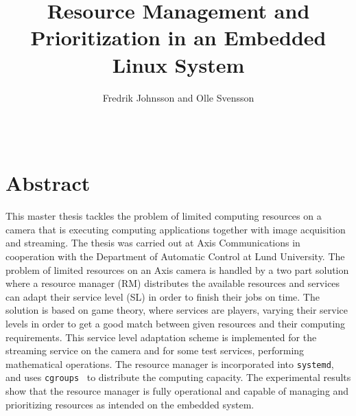 \documentclass[nobiblatex]{LTHthesis}
\begin{document}


\begin{verbatim}
\end{verbatim}





\begin{titlepages}
\author{Fredrik Johnsson and Olle Svensson}
\title{Resource Management and Prioritization in an Embedded Linux System}

\end{titlepages}
\setcounter{page}{1}

\chapter*{Abstract}

This master thesis tackles the problem of limited computing resources on a
camera that is executing computing applications together with image
acquisition and streaming. The thesis was carried out at Axis Communications
in cooperation with the Department of Automatic Control at Lund University. The
problem of limited resources on an Axis camera is handled by a two part
solution where a resource manager (RM) distributes the available resources
and services can adapt their service level (SL) in order to finish their
jobs on time. The solution is based on game theory, where services are
players, varying their service levels in order to get a good match between
given resources and their computing requirements. This service level
adaptation scheme is implemented for the streaming service on the
camera and for some test services, performing mathematical operations. 
The resource manager is incorporated into \texttt{systemd}, and uses 
\texttt{cgroups}~\cite{cgroups} to distribute the computing capacity. The
experimental results show that the resource manager is fully operational and
capable of managing and prioritizing resources as intended on the embedded
system.
\end{document}
